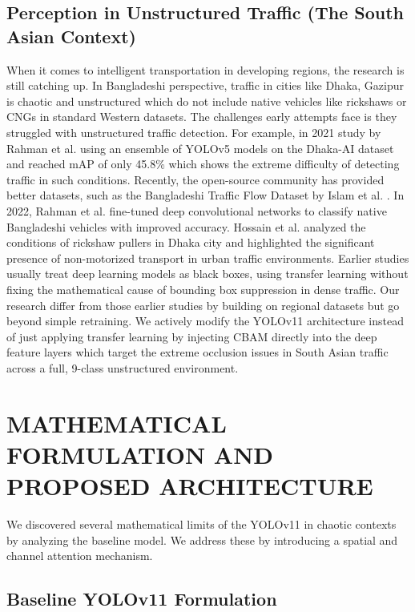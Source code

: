 \documentclass[conference]{IEEEtran}
\begin{document}
\subsection{Perception in Unstructured Traffic (The South Asian Context)}
When it comes to intelligent transportation in developing regions, the research is still catching up. In Bangladeshi perspective, traffic in cities like Dhaka, Gazipur is chaotic and unstructured which do not include native vehicles like rickshaws or CNGs in standard Western datasets. The challenges early attempts face is they struggled with unstructured traffic detection. For example, in 2021 study by Rahman et al.\cite{rahman2021densely} using an ensemble of YOLOv5 models on the Dhaka-AI dataset and reached mAP of only 45.8\% which shows the extreme difficulty of detecting traffic in such conditions. Recently, the open-source community has provided better datasets, such as the Bangladeshi Traffic Flow Dataset by Islam et al. \cite{Islam2025BangladeshiTrafficFlow}. In 2022, Rahman et al.\cite{rahman2022fine} fine-tuned deep convolutional networks to classify native Bangladeshi vehicles with improved accuracy. Hossain et al.\cite{17a} analyzed the conditions of rickshaw pullers in Dhaka city and highlighted the significant presence of non-motorized transport in urban traffic environments. Earlier studies usually treat deep learning models as black boxes, using transfer learning without fixing the mathematical cause of bounding box suppression in dense traffic. Our research differ from those earlier studies by building on regional datasets but go beyond simple retraining. We actively modify the YOLOv11 architecture instead of just applying transfer learning by injecting CBAM directly into the deep feature layers which target the extreme occlusion issues in South Asian traffic across a full, 9-class unstructured environment.

\section{MATHEMATICAL FORMULATION AND PROPOSED ARCHITECTURE}
We discovered several mathematical limits of the YOLOv11 in chaotic contexts by analyzing the baseline model. We address these by introducing a spatial and channel attention mechanism. 


\subsection{Baseline YOLOv11 Formulation}
\end{document}
